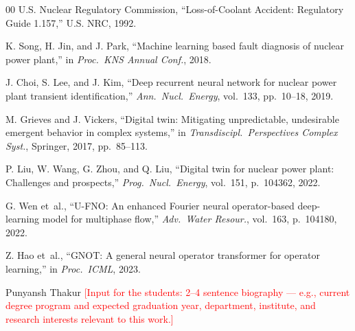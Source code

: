 \documentclass[journal]{IEEEtran}
\begin{document}
\begin{thebibliography}{00}
U.S. Nuclear Regulatory Commission,
``Loss-of-Coolant Accident: Regulatory Guide 1.157,''
U.S. NRC, 1992.

K. Song, H. Jin, and J. Park,
``Machine learning based fault diagnosis of nuclear power plant,''
in \textit{Proc.\ KNS Annual Conf.}, 2018.

J. Choi, S. Lee, and J. Kim,
``Deep recurrent neural network for nuclear power plant transient identification,''
\textit{Ann.\ Nucl.\ Energy}, vol.~133, pp.~10--18, 2019.

M. Grieves and J. Vickers,
``Digital twin: Mitigating unpredictable, undesirable emergent behavior in complex systems,''
in \textit{Transdiscipl.\ Perspectives Complex Syst.}, Springer, 2017, pp.~85--113.

P. Liu, W. Wang, G. Zhou, and Q. Liu,
``Digital twin for nuclear power plant: Challenges and prospects,''
\textit{Prog.\ Nucl.\ Energy}, vol.~151, p.~104362, 2022.

G. Wen et~al.,
``U-FNO: An enhanced Fourier neural operator-based deep-learning model for multiphase flow,''
\textit{Adv.\ Water Resour.}, vol.~163, p.~104180, 2022.

Z. Hao et~al.,
``GNOT: A general neural operator transformer for operator learning,''
in \textit{Proc.\ ICML}, 2023.

\end{thebibliography}


\begin{IEEEbiographynophoto}{Punyansh Thakur}
\textcolor{red}{[Input for the students: 2--4 sentence biography --- e.g., current degree program and expected graduation year, department, institute, and research interests relevant to this work.]}
\end{IEEEbiographynophoto}
\end{document}
